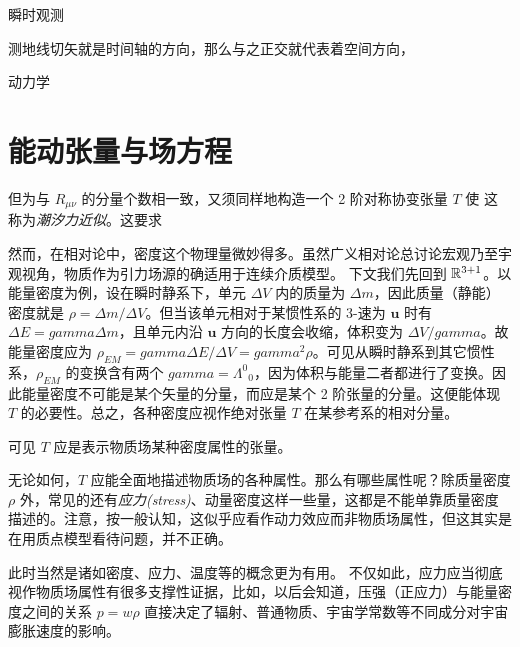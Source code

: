 瞬时观测




测地线切矢就是时间轴的方向，那么与之正交就代表着空间方向，


动力学





\section{能动张量与场方程}

但为与 $R_{\mu\nu}$ 的分量个数相一致，又须同样地构造一个 2 阶对称协变张量 $T$ 使
这称为\textit{潮汐力近似}。这要求

然而，在相对论中，密度这个物理量微妙得多。虽然广义相对论总讨论宏观乃至宇观视角，物质作为引力场源的确适用于连续介质模型。
下文我们先回到 $\mathbb{R}^{3+1}$。以能量密度为例，设在瞬时静系下，单元 $\Delta V$ 内的质量为 $\Delta m$，因此质量（静能）密度就是 $\rho=\Delta m/\Delta V$。但当该单元相对于某惯性系的 3-速为 $\bm{u}$ 时有 $\Delta E=gamma \Delta m$，且单元内沿 $\bm u$ 方向的长度会收缩，体积变为 $\Delta V/gamma$。故能量密度应为 $\rho_{EM}=gamma\Delta E/\Delta V=gamma^2\rho$。可见从瞬时静系到其它惯性系，$\rho_{EM}$ 的变换含有两个 $gamma=\Lambda^0{}_{0}$，因为体积与能量二者都进行了变换。因此能量密度不可能是某个矢量的分量，而应是某个 2 阶张量的分量。这便能体现 $T$ 的必要性。总之，各种密度应视作绝对张量 $T$ 在某参考系的相对分量。

可见 $T$ 应是表示物质场某种密度属性的张量。

无论如何，$T$ 应能全面地描述物质场的各种属性。那么有哪些属性呢？除质量密度 $\rho$ 外，常见的还有\textit{应力(stress)}、动量密度这样一些量，这都是不能单靠质量密度描述的。注意，按一般认知，这似乎应看作动力效应而非物质场属性，但这其实是在用质点模型看待问题，并不正确。

此时当然是诸如密度、应力、温度等的概念更为有用。
不仅如此，应力应当彻底视作物质场属性有很多支撑性证据，比如，以后会知道，压强（正应力）与能量密度之间的关系 $p=w\rho$ 直接决定了辐射、普通物质、宇宙学常数等不同成分对宇宙膨胀速度的影响。
 



